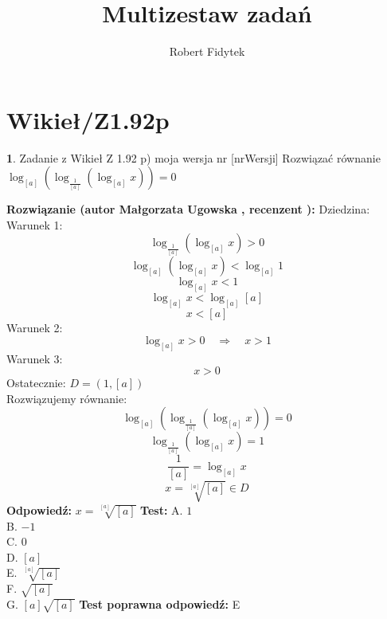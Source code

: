 \documentclass[12pt, a4paper]{article}
\title{Multizestaw zadań}
\author{Robert Fidytek}
\date{}
\theoremstyle{definition} %
\newtheorem{zad}{}
\newcommand{\kategoria}[1]{\section{#1}} %
\newcommand{\zadStart}[1]{\begin{zad}#1\newline} %
\newcommand{\zadStop}{\end{zad}}   %
\newcommand{\rozwStart}[2]{\noindent \textbf{Rozwiązanie (autor #1 , recenzent #2): }\newline} %
\newcommand{\rozwStop}{\newline}                                            %
\newcommand{\odpStart}{\noindent \textbf{Odpowiedź:}\newline}    %
\newcommand{\odpStop}{\newline}                                             %
\newcommand{\testStart}{\noindent \textbf{Test:}\newline} %
\newcommand{\testStop}{\newline} %
\newcommand{\kluczStart}{\noindent \textbf{Test poprawna odpowiedź:}\newline} %
\newcommand{\kluczStop}{\newline} %
\begin{document}
\maketitle


\kategoria{Wikieł/Z1.92p}
\zadStart{Zadanie z Wikieł Z 1.92 p) moja wersja nr [nrWersji]}
Rozwiązać równanie $\log_{[a]}{(\log_{\frac{1}{[a]}}{(\log_{[a]}{x})})}=0$
\zadStop
\rozwStart{Małgorzata Ugowska}{}
Dziedzina:\\
Warunek 1:
$$\log_{\frac{1}{[a]}}{(\log_{[a]}{x})}>0$$
$$ \log_{[a]}{(\log_{[a]}{x})}<\log_{[a]}{1} $$
$$\log_{[a]}{x}<1$$
$$\log_{[a]}{x}<\log_{[a]}{[a]}$$
$$x<[a]$$
Warunek 2:
$$\log_{[a]}{x}>0 \quad \Longrightarrow \quad x>1$$
Warunek 3:
$$x>0$$
Ostatecznie: $D =  (1, [a])$\\
Rozwiązujemy równanie:
$$\log_{[a]}{(\log_{\frac{1}{[a]}}{(\log_{[a]}{x})})}=0$$
$$\log_{\frac{1}{[a]}}{(\log_{[a]}{x})}=1$$
$$\frac{1}{[a]}= \log_{[a]}{x}$$
$$x = \sqrt[{[a]}]{[a]} \in D$$
\rozwStop
\odpStart
$x =  \sqrt[{[a]}]{[a]}$
\odpStop
\testStart
A. $1$\\
B. $-1$\\
C. $0$\\
D. $[a]$\\
E. $ \sqrt[{[a]}]{[a]}$\\
F. $\sqrt{[a]}$\\
G. $[a]\sqrt{[a]}$
\testStop
\kluczStart
E
\kluczStop
\end{document}
